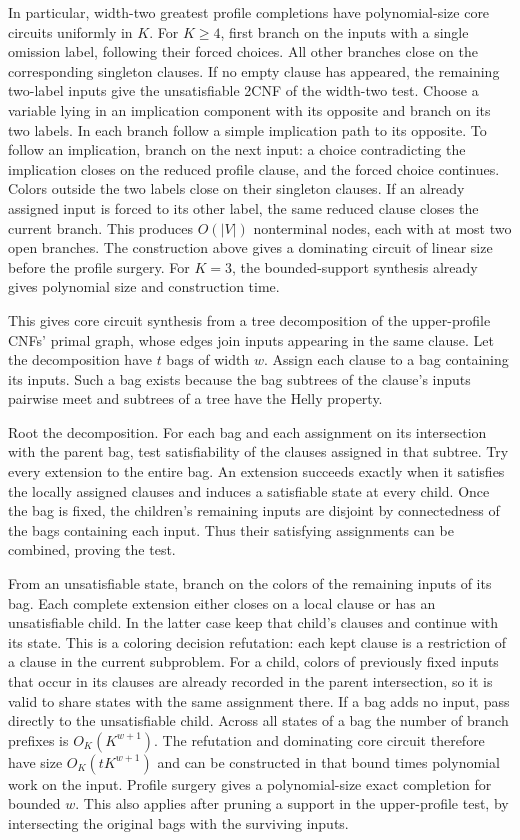 In particular, width-two greatest profile completions
have polynomial-size core circuits uniformly in $K$.
For $K\ge4$, first branch on the inputs with a single
omission label, following their forced choices.
All other branches close on the corresponding
singleton clauses. If no empty clause has appeared,
the remaining two-label inputs give the unsatisfiable
2CNF of the width-two test. Choose a variable lying
in an implication component with its opposite and
branch on its two labels. In each branch follow a
simple implication path to its opposite. To follow an
implication, branch on the next input: a choice
contradicting the implication closes on the reduced
profile clause, and the forced choice continues.
Colors outside the two labels close on their
singleton clauses. If an already assigned input is
forced to its other label, the same reduced clause
closes the current branch. This produces $O(|V|)$
nonterminal nodes, each with at most two open
branches. The construction above gives a dominating
circuit of linear size before the profile surgery.
For $K=3$, the bounded-support synthesis already
gives polynomial size and construction time.

This gives core circuit synthesis from a tree decomposition
of the upper-profile CNFs' primal graph, whose edges join
inputs appearing in the same clause. Let the decomposition
have $t$ bags of width $w$. Assign each clause to a bag
containing its inputs. Such a bag exists because the bag
subtrees of the clause's inputs pairwise meet and subtrees
of a tree have the Helly property.

Root the decomposition. For each bag and each assignment
on its intersection with the parent bag, test satisfiability
of the clauses assigned in that subtree. Try every extension
to the entire bag. An extension succeeds exactly when it
satisfies the locally assigned clauses and induces a
satisfiable state at every child. Once the bag is fixed,
the children's remaining inputs are disjoint by connectedness
of the bags containing each input. Thus their satisfying
assignments can be combined, proving the test.

From an unsatisfiable state, branch on the colors of the
remaining inputs of its bag. Each complete extension either
closes on a local clause or has an unsatisfiable child.
In the latter case keep that child's clauses and continue
with its state. This is a coloring decision refutation:
each kept clause is a restriction of a clause in the
current subproblem. For a child, colors of previously fixed
inputs that occur in its clauses are already recorded in
the parent intersection, so it is valid to share states
with the same assignment there. If a bag adds no input,
pass directly to the unsatisfiable child.
Across all states of a bag the number of branch prefixes
is $O_K(K^{w+1})$. The refutation and dominating core
circuit therefore have size $O_K(tK^{w+1})$ and can be
constructed in that bound times polynomial work on the
input. Profile surgery gives a polynomial-size exact
completion for bounded $w$. This also applies after
pruning a support in the upper-profile test, by
intersecting the original bags with the surviving inputs.

